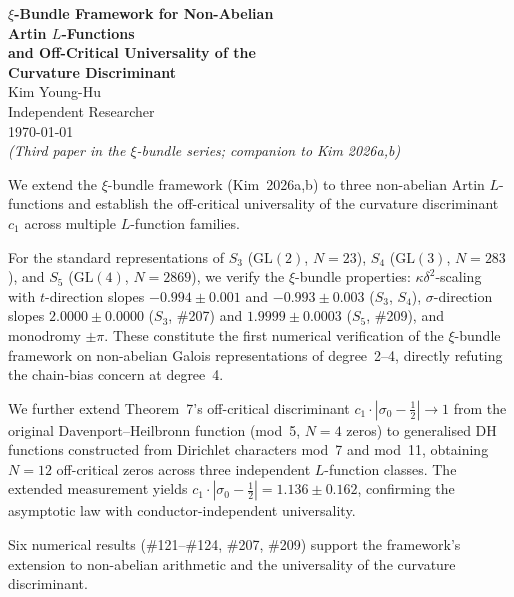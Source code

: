 \documentclass[11pt, a4paper]{article}
\theoremstyle{plain}
\theoremstyle{definition}
\newcommand{\abs}[1]{\left|#1\right|}
\newcommand{\kap}{\kappa}             %
\begin{document}
\begin{center}
  {\LARGE\bfseries $\xi$-Bundle Framework for Non-Abelian}\\[4pt]
  {\LARGE\bfseries Artin $L$-Functions}\\[6pt]
  {\large\bfseries and Off-Critical Universality of the\\[2pt]
   Curvature Discriminant}\\[18pt]
  {\large Kim Young-Hu}\\[4pt]
  {\normalsize Independent Researcher}\\[4pt]
  {\small\today}\\[4pt]
  {\small\textit{(Third paper in the $\xi$-bundle series; companion to
   Kim 2026a,b)}}
\end{center}

\vspace{1.5em}

\begin{tcolorbox}[
  colback=lightbg, colframe=zetaviolet!60!black,
  title={\bfseries Abstract}, fonttitle=\large,
  arc=3pt, boxrule=0.8pt, toptitle=3pt, bottomtitle=3pt
]
We extend the $\xi$-bundle framework (Kim~2026a,b) to three
non-abelian Artin $L$-functions and establish the off-critical
universality of the curvature discriminant $c_{1}$ across multiple
$L$-function families.

For the standard representations of $S_{3}$ ($\mathrm{GL}(2)$,
$N=23$), $S_{4}$ ($\mathrm{GL}(3)$, $N=283$), and $S_{5}$
($\mathrm{GL}(4)$, $N=2869$), we verify the $\xi$-bundle properties:
$\kap\delta^{2}$-scaling with $t$-direction slopes $-0.994\pm0.001$
and $-0.993\pm0.003$ ($S_{3}$, $S_{4}$), $\sigma$-direction slopes
$2.0000\pm0.0000$ ($S_{3}$, \#207) and $1.9999\pm0.0003$ ($S_{5}$,
\#209), and monodromy $\pm\pi$.  These constitute the first numerical
verification of the $\xi$-bundle framework on non-abelian Galois
representations of degree~2--4, directly refuting the chain-bias
concern at degree~4.

We further extend Theorem~7's off-critical discriminant
$c_{1}\cdot\abs{\sigma_{0}-\tfrac{1}{2}} \to 1$ from the original
Davenport--Heilbronn function (mod~5, $N=4$ zeros) to generalised DH
functions constructed from Dirichlet characters mod~7 and mod~11,
obtaining $N=12$ off-critical zeros across three independent
$L$-function classes.  The extended measurement yields
$c_{1}\cdot\abs{\sigma_{0}-\tfrac{1}{2}} = 1.136 \pm 0.162$,
confirming the asymptotic law with conductor-independent universality.

\smallskip
\noindent Six numerical results (\#121--\#124, \#207, \#209) support the
framework's extension to non-abelian arithmetic and the universality
of the curvature discriminant.
\end{tcolorbox}
\end{document}
